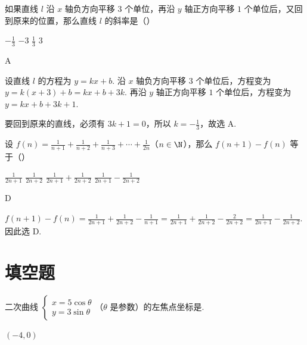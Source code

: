 \begin{problem}
如果直线 \(l\) 沿 \(x\) 轴负方向平移 \(3\) 个单位，再沿 \(y\) 轴正方向平移 \(1\) 个单位后，又回到原来的位置，那么直线 \(l\) 的斜率是（\quad）

\choices
    {\(-\frac{1}{3}\)}
    {\(-3\)}
    {\(\frac{1}{3}\)}
    {\(3\)}
\end{problem}

\begin{answer}
A
\end{answer}

\begin{solution}
设直线 \(l\) 的方程为 \(y=kx+b\). 沿 \(x\) 轴负方向平移 \(3\) 个单位后，方程变为
\(y=k(x+3)+b=kx+b+3k\). 再沿 \(y\) 轴正方向平移 \(1\) 个单位后，方程变为 \(y=kx+b+3k+1\).

要回到原来的直线，必须有 \(3k+1=0\)，所以 \(k=-\frac{1}{3}\)，故选 A.
\end{solution}

\begin{problem}
设 \(f(n)=\frac{1}{n+1}+\frac{1}{n+2}+\frac{1}{n+3}+\cdots+\frac{1}{2n}\)（\(n \in \N\)），那么 \(f(n+1)-f(n)\) 等于（\quad）

\choices
    {\(\frac{1}{2n+1}\)}
    {\(\frac{1}{2n+2}\)}
    {\(\frac{1}{2n+1}+\frac{1}{2n+2}\)}
    {\(\frac{1}{2n+1}-\frac{1}{2n+2}\)}
\end{problem}

\begin{answer}
D
\end{answer}

\begin{solution}
\(f(n+1)-f(n)=\frac{1}{2n+1}+\frac{1}{2n+2}-\frac{1}{n+1}=\frac{1}{2n+1}+\frac{1}{2n+2}-\frac{2}{2n+2}=\frac{1}{2n+1}-\frac{1}{2n+2}\).
因此选 D.
\end{solution}

\section{填空题}

\begin{problem}
二次曲线 \(\begin{cases}
x = 5\cos \theta\\
y = 3\sin \theta
\end{cases}\)（\(\theta\) 是参数）的左焦点坐标是\fillinblank{}.
\end{problem}

\begin{answer}
\((-4,0)\)
\end{answer}


